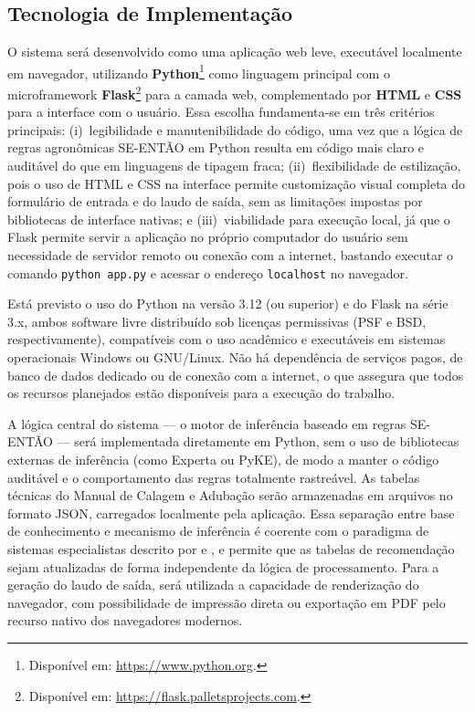 \subsection{Tecnologia de Implementação}\label{sec:tecnologia}

O sistema será desenvolvido como uma aplicação web leve, executável
localmente em navegador, utilizando \textbf{Python}\footnote{Disponível
em: \url{https://www.python.org}.} como linguagem principal
com o microframework \textbf{Flask}\footnote{Disponível em:
\url{https://flask.palletsprojects.com}.} para a camada web, complementado por
\textbf{HTML} e \textbf{CSS} para a interface com o usuário. Essa escolha
fundamenta-se em três critérios principais: (i)~legibilidade e manutenibilidade
do código, uma vez que a lógica de regras agronômicas SE-ENTÃO em Python
resulta em código mais claro e auditável do que em linguagens de tipagem fraca;
(ii)~flexibilidade de estilização, pois o uso de HTML e CSS na interface permite
customização visual completa do formulário de entrada e do laudo de saída,
sem as limitações impostas por bibliotecas de interface nativas; e
(iii)~viabilidade para execução local, já que o Flask permite servir a aplicação
no próprio computador do usuário sem necessidade de servidor remoto ou conexão
com a internet, bastando executar o comando \texttt{python app.py} e acessar
o endereço \texttt{localhost} no navegador.

Está previsto o uso do Python na versão 3.12 (ou superior) e do Flask na
série 3.x, ambos software livre distribuído sob licenças permissivas
(PSF e BSD, respectivamente), compatíveis com o uso acadêmico e executáveis
em sistemas operacionais Windows ou GNU/Linux. Não há dependência de
serviços pagos, de banco de dados dedicado ou de conexão com a internet,
o que assegura que todos os recursos planejados estão disponíveis para a
execução do trabalho.

A lógica central do sistema --- o motor de inferência baseado em regras
SE-ENTÃO --- será implementada diretamente em Python, sem o uso de bibliotecas
externas de inferência (como Experta ou PyKE), de modo a manter o código
auditável e o comportamento das regras totalmente rastreável. As tabelas técnicas
do Manual de Calagem e Adubação \citep{ManualCalagem2016} serão armazenadas em
arquivos no formato JSON, carregados localmente pela aplicação. Essa separação
entre base de conhecimento e mecanismo de inferência é coerente com o paradigma
de sistemas especialistas descrito por \cite{Lanzer2010} e \cite{SantosEtAl1994},
e permite que as tabelas de recomendação sejam atualizadas de forma independente
da lógica de processamento. Para a geração do laudo de saída, será utilizada
a capacidade de renderização do navegador, com possibilidade de impressão
direta ou exportação em PDF pelo recurso nativo dos navegadores modernos.

